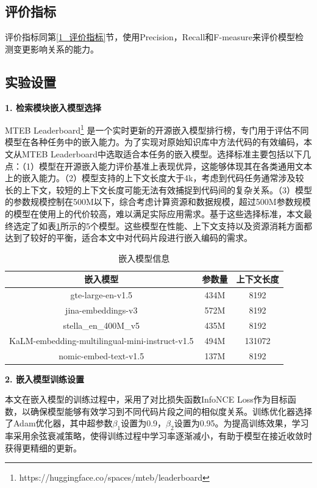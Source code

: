 \subsection{评价指标} 
评价指标同第\ref{1_评价指标}节，使用Precision，Recall和F-measure来评价模型检测变更影响关系的能力。

\subsection{实验设置}

\noindent \textbf{1. 检索模块嵌入模型选择}

MTEB Leaderboard\footnote{https://huggingface.co/spaces/mteb/leaderboard} 是一个实时更新的开源嵌入模型排行榜，专门用于评估不同模型在各种任务中的嵌入能力。为了实现对原始知识库中方法代码的有效编码，本文从MTEB Leaderboard中选取适合本任务的嵌入模型。选择标准主要包括以下几点：（1）模型在开源嵌入能力评价基准上表现优异，这能够体现其在各类通用文本上的嵌入能力。（2）模型支持的上下文长度大于4k，考虑到代码任务通常涉及较长的上下文，较短的上下文长度可能无法有效捕捉到代码间的复杂关系。（3）模型的参数规模控制在500M以下，综合考虑计算资源和数据规模，超过500M参数规模的模型在使用上的代价较高，难以满足实际应用需求。基于这些选择标准，本文最终选定了如表\ref{2_嵌入模型参数量}所示的5个模型。这些模型在性能、上下文支持以及资源消耗方面都达到了较好的平衡，适合本文中对代码片段进行嵌入编码的需求。
    
    \begin{table}[htbp]
    \caption{嵌入模型信息}
    \label{2_嵌入模型参数量}
    \vspace{0.5em}\centering\wuhao
    \begin{tabular}{ccc}
    \toprule
    嵌入模型 & 参数量 & 上下文长度  \\
    \midrule
    gte-large-en-v1.5 & 434M & 8192 \\
    jina-embeddings-v3 & 572M & 8192\\
    stella\_en\_400M\_v5 & 435M & 8192 \\
    KaLM-embedding-multilingual-mini-instruct-v1.5 & 494M & 131072 \\
    nomic-embed-text-v1.5 & 137M & 8192 \\
    \bottomrule
    \end{tabular}
    \end{table}

\noindent \textbf{2. 嵌入模型训练设置}

本文在嵌入模型的训练过程中，采用了对比损失函数InfoNCE Loss作为目标函数，以确保模型能够有效学习到不同代码片段之间的相似度关系。训练优化器选择了Adam优化器，其中超参数$\beta_1$设置为0.9，$\beta_2$设置为0.95。为提高训练效果，学习率采用余弦衰减策略，使得训练过程中学习率逐渐减小，有助于模型在接近收敛时获得更精细的更新。

